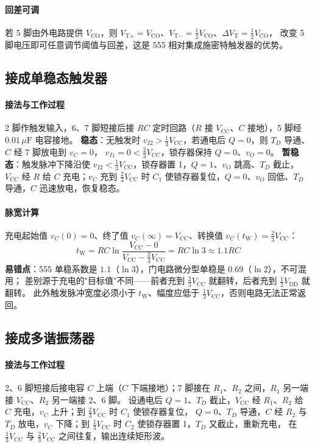 \paragraph{回差可调}
若 5 脚由外电路提供 $V_\text{CO}$，则 $V_{\text{T}+}=V_\text{CO}$、$V_{\text{T}-}=\frac{1}{2}V_\text{CO}$、$\Delta V_\text{T}=\frac{1}{2}V_\text{CO}$，
改变 5 脚电压即可任意调节阈值与回差，这是 555 相对集成施密特触发器的优势。

\subsection{接成单稳态触发器}
\paragraph{接法与工作过程}
2 脚作触发输入，6、7 脚短接后接 $RC$ 定时回路（$R$ 接 $V_\text{CC}$、$C$ 接地），5 脚经 $0.01\,\mu\mathrm{F}$ 电容接地。
\textbf{稳态}：无触发时 $v_{I2}>\frac{1}{3}V_\text{CC}$，若通电后 $Q=0$，则 $T_D$ 导通、$C$ 经 7 脚放电到 $v_C=0$，
$v_{I1}=0<\frac{2}{3}V_\text{CC}$，锁存器保持 $Q=0$、$v_O=0$。
\textbf{暂稳态}：触发脉冲下降沿使 $v_{I2}<\frac{1}{3}V_\text{CC}$，锁存器置 1，$Q=1$、$v_O$ 跳高、$T_D$ 截止，
$V_\text{CC}$ 经 $R$ 给 $C$ 充电；$v_C$ 充到 $\frac{2}{3}V_\text{CC}$ 时 $C_1$ 使锁存器复位，$Q=0$、$v_O$ 回低、$T_D$ 导通，$C$ 迅速放电，恢复稳态。

\paragraph{脉宽计算}
充电起始值 $v_C(0)=0$、终了值 $v_C(\infty)=V_\text{CC}$、转换值 $v_C(t_\text{W})=\frac{2}{3}V_\text{CC}$：
\[
t_\text{W}=RC\ln\frac{V_\text{CC}-0}{V_\text{CC}-\frac{2}{3}V_\text{CC}}=RC\ln3\approx1.1RC
\]
\textbf{易错点}：555 单稳系数是 $1.1$（$\ln3$），门电路微分型单稳是 $0.69$（$\ln2$），不可混用；
差别源于充电的"目标值"不同——前者充到 $\frac{2}{3}V_\text{CC}$ 就翻转，后者充到 $\frac{1}{2}V_\text{DD}$ 就翻转。
此外触发脉冲宽度必须小于 $t_\text{W}$、幅度应低于 $\frac{1}{3}V_\text{CC}$，否则电路无法正常返回。

\subsection{接成多谐振荡器}
\paragraph{接法与工作过程}
2、6 脚短接后接电容 $C$ 上端（$C$ 下端接地）；7 脚接在 $R_1$、$R_2$ 之间，$R_1$ 另一端接 $V_\text{CC}$、$R_2$ 另一端接 2、6 脚。
设通电后 $Q=1$、$T_D$ 截止，$V_\text{CC}$ 经 $R_1$、$R_2$ 给 $C$ 充电，$v_C$ 上升；到 $\frac{2}{3}V_\text{CC}$ 时 $C_1$ 使锁存器复位，
$Q=0$、$T_D$ 导通，$C$ 经 $R_2$ 与 $T_D$ 放电，$v_C$ 下降；到 $\frac{1}{3}V_\text{CC}$ 时 $C_2$ 使锁存器置 1，$T_D$ 又截止，重新充电，
在 $\frac{1}{3}V_\text{CC}$ 与 $\frac{2}{3}V_\text{CC}$ 之间往复，输出连续矩形波。

